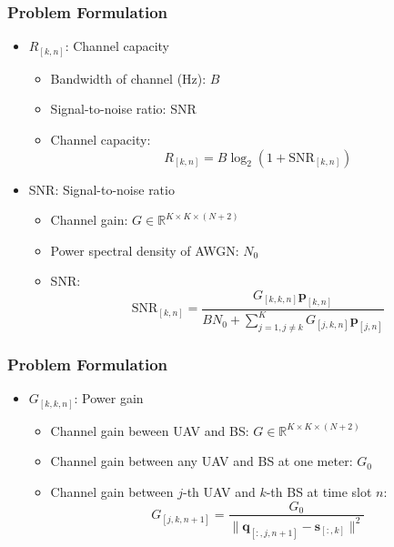 \documentclass[11.5pt]{beamer}
\begin{document}
\begin{frame}
	\frametitle{Problem Formulation}
	\begin{itemize}\itemsep2em
		\item<1-> $R_{[k,n]}$: Channel capacity
		\begin{itemize}
			\item Bandwidth of channel (Hz): $B$
			\item Signal-to-noise ratio: SNR
			\item Channel capacity:
				\begin{equation}
					R_{[k,n]} = B\log_2\left(1+\text{SNR}_{[k,n]}\right)\tag{5.1}
				\end{equation}
		\end{itemize}
		\item<2-> SNR: Signal-to-noise ratio
		\begin{itemize}
			\item Channel gain: $G\in\mathbb{R}^{K\times K\times (N+2)}$
			\item Power spectral density of AWGN: $N_0$
			\item SNR:
				 \begin{equation}\label{Eq5.2}
					\text{SNR}_{[k,n]} = \frac{G_{[k,k,n]}\boldsymbol{p}_{[k,n]}}{BN_0+\sum_{j=1,j\ne k}^{K}    G_{[j,k,n]}\boldsymbol{p}_{[j,n]}}\tag{5.2}
				 \end{equation}
		\end{itemize}
	\end{itemize}
\end{frame}


\begin{frame}
	\frametitle{Problem Formulation}
	\begin{itemize}\itemsep4em
		\item<1-> $G_{[k,k,n]}$: Power gain
		\begin{itemize}
			\item Channel gain beween UAV and BS: $G\in\mathbb{R}^{K\times K\times (N+2)}$
			\item Channel gain between any UAV and BS at one meter: $G_0$
			\item Channel gain between $j$-th UAV and $k$-th BS at time slot $n$:
				\begin{equation}\label{Eq5.3}
					G_{[j,k,n+1]}=\frac{G_0}{\lVert\boldsymbol{q}_{[:,j,n+1]}-\boldsymbol{s}_{[:,k]}\rVert^2} 	 						\tag{5.3}
				\end{equation}
		\end{itemize}
	\end{itemize}
\end{frame}
\end{document}

